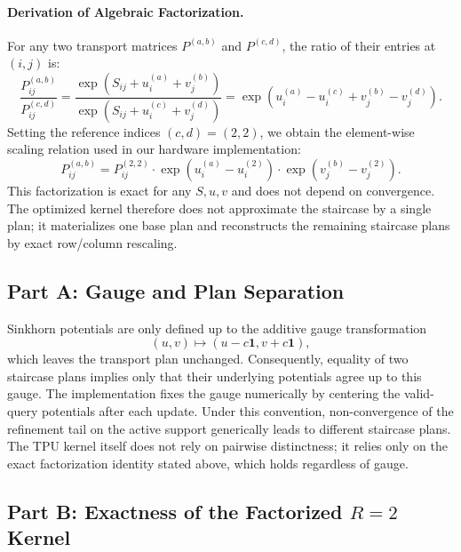 \documentclass{article}
\begin{document}
\paragraph{Derivation of Algebraic Factorization.}
For any two transport matrices $P^{(a,b)}$ and $P^{(c,d)}$, the ratio of their entries at $(i,j)$ is:
\begin{equation}
    \frac{P^{(a,b)}_{ij}}{P^{(c,d)}_{ij}} = \frac{\exp(S_{ij} + u^{(a)}_i + v^{(b)}_j)}{\exp(S_{ij} + u^{(c)}_i + v^{(d)}_j)} = \exp(u^{(a)}_i - u^{(c)}_i + v^{(b)}_j - v^{(d)}_j).
\end{equation}
Setting the reference indices $(c,d) = (2,2)$, we obtain the element-wise scaling relation used in our hardware implementation:
\begin{equation}
    P^{(a,b)}_{ij} = P^{(2,2)}_{ij} \cdot \exp(u^{(a)}_i - u^{(2)}_i) \cdot \exp(v^{(b)}_j - v^{(2)}_j).
\end{equation}
This factorization is exact for any $S, u, v$ and does not depend on convergence. The optimized kernel therefore does not approximate the staircase by a single plan; it materializes one base plan and reconstructs the remaining staircase plans by exact row/column rescaling.

\subsection*{Part A: Gauge and Plan Separation}

Sinkhorn potentials are only defined up to the additive gauge transformation
\begin{equation}
    (u, v) \mapsto (u - c\mathbf{1}, v + c\mathbf{1}),
\end{equation}
which leaves the transport plan unchanged. Consequently, equality of two staircase plans implies only that their underlying potentials agree up to this gauge. The implementation fixes the gauge numerically by centering the valid-query potentials after each update. Under this convention, non-convergence of the refinement tail on the active support generically leads to different staircase plans. The TPU kernel itself does not rely on pairwise distinctness; it relies only on the exact factorization identity stated above, which holds regardless of gauge.

\subsection*{Part B: Exactness of the Factorized $R=2$ Kernel}
\end{document}
